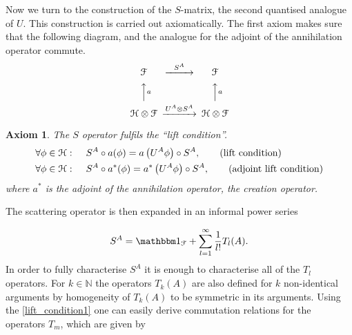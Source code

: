 \documentclass[b5paper,draft,openbib,12pt]{memoir}
\newtheorem{axiom}{Axiom}
\newcommand{\id}{{\mathbbm 1}}
\begin{document}
Now we turn to the construction of the \(S\)-matrix, the second quantised analogue of \(U\). This construction is carried out axiomatically. The first axiom makes sure that the following diagram, and the analogue for the adjoint of the annihilation operator commute.
\begin{equation}
\begin{CD}								%
\mathcal{F}     @>S^A>>  \mathcal{F}\\
@AAaA        @AAaA\\
\mathcal{H}\otimes \mathcal{F}     @>U^A\otimes S^A>>  \mathcal{H}\otimes \mathcal{F} 
\end{CD}
\end{equation}
\begin{axiom}
The \(S\) operator fulfils the ``lift condition''.
\begin{align}\label{lift_condition1}
\forall \phi\in \mathcal{H}:& \hspace{0.5cm} S^A \circ a(\phi)=a\left( U^A \phi \right)  \circ S^A,\tag{lift condition}\\
\forall \phi\in \mathcal{H}:& \hspace{0.5cm} S^A \circ a^*(\phi)=a^*\left( U^A \phi \right)  \circ S^A,\tag{adjoint lift condition}
\end{align}
where \(a^*\) is the adjoint of the annihilation operator, the creation operator. 
\end{axiom}
The scattering operator is then expanded in an informal 
power series

\begin{equation}\label{S_expansion}
S^A=\id_\mathcal{F}+\sum_{l=1}^\infty \frac{1}{l!} T_l(A).
\end{equation}
In order to fully characterise \(S^A\) it is enough to characterise all of the \(T_l\) operators. For \(k\in \mathbb{N}\) the operators \(T_k (A)\) are also defined for \(k\) non-identical arguments by homogeneity of \(T_k(A)\) to be symmetric in its arguments. Using the \eqref{lift_condition1} one can easily derive commutation relations for the operators \(T_m\), which are given by
\end{document}
